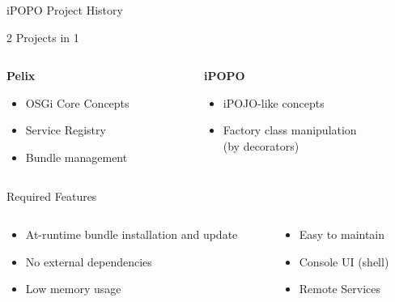 \begin{frame}{iPOPO Project History}
\begin{block}{2 Projects in 1}
\begin{columns}
\begin{column}{.5\textwidth}
\vspace{-1em}
\begin{center}
\textbf{Pelix}
\vspace{-1em}
\end{center}
\begin{itemize}
\item OSGi Core Concepts
\item Service Registry
\item Bundle management
\end{itemize}
\end{column}

\begin{column}{.5\textwidth}
\vspace{-1em}
\begin{center}
\textbf{iPOPO}
\vspace{-1em}
\end{center}
\begin{itemize}
\item iPOJO-like concepts
\item Factory class manipulation \\ (by decorators)
\end{itemize}
\end{column}
\end{columns}
\end{block}

\begin{block}{Required Features}
\begin{columns}
\begin{column}{.65\textwidth}
\begin{itemize}
\item At-runtime bundle installation and update
\item No external dependencies
\item Low memory usage
\end{itemize}
\end{column}

\begin{column}{.4\textwidth}
\begin{itemize}
\item Easy to maintain
\item Console UI (shell)
\item Remote Services
\end{itemize}
\end{column}
\end{columns}
\end{block}

\end{frame}

